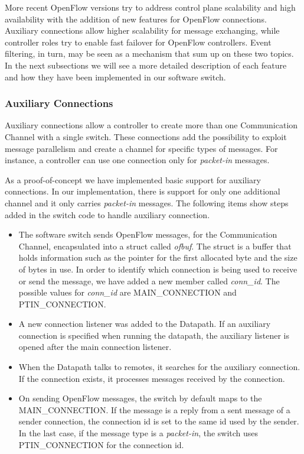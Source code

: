     More recent OpenFlow versions try to address control plane scalability and high availability with the addition of new features for OpenFlow connections. Auxiliary connections allow higher scalability for message exchanging, while controller roles try to enable fast failover for OpenFlow controllers. Event filtering, in turn, may be seen as a mechanism that sum up on these two topics. In the next subsections we will see a more detailed description of each feature and how they have been implemented in our software switch.
    
    \subsubsection{Auxiliary Connections}
    
    Auxiliary connections allow a controller to create more than one Communication Channel with a single switch. These connections add the possibility to exploit message parallelism and create a channel for specific types of messages. For instance, a controller can use one connection only for \textit{packet-in} messages. 
    
    As a proof-of-concept we have implemented basic support for auxiliary connections. In our implementation, there is support for only one additional channel and it only carries \textit{packet-in} messages. The following items show steps added in the switch code to handle auxiliary connection.
    
    \begin{itemize}
    \item The software switch sends OpenFlow messages, for the Communication Channel, encapsulated into a struct called \textit{ofbuf}. The struct is a buffer that holds information such as the pointer for the first allocated byte and the size of bytes in use. In order to identify which connection is being used to receive or send the message, we have added a new member called \textit{conn_id}. The possible values for \textit{conn_id} are MAIN_CONNECTION and PTIN_CONNECTION.  
    
    \item A new connection listener was added to the Datapath. If an auxiliary connection is specified when running the datapath, the auxiliary listener is opened after the main connection listener.
    
    \item When the Datapath talks to remotes, it searches for the auxiliary connection. If the connection exists, it processes messages received by the connection.
    
    \item On sending OpenFlow messages, the switch by default maps to the MAIN_CONNECTION. If the message is a reply from  a sent message of a sender connection, the connection id is set to the same id used by the sender. In the last case, if the message type is a \textit{packet-in}, the switch uses PTIN_CONNECTION for the connection id. 
    
    \end{itemize}
    
